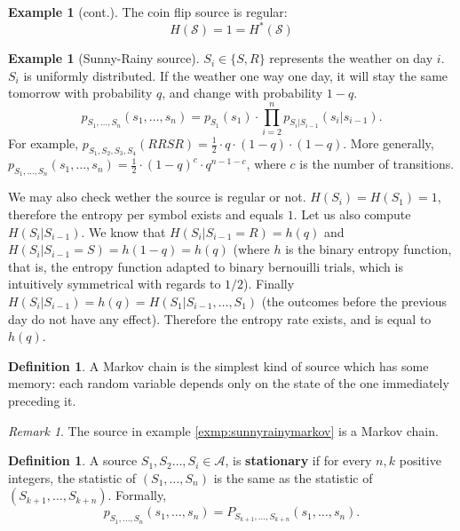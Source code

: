 \documentclass{report}
\theoremstyle{plain}
\theoremstyle{definition}
\newtheorem{exmp}[thm]{Example}
\newtheorem{defn}[thm]{Definition}
\theoremstyle{remark}
\newtheorem*{remark}{Remark}
\begin{document}
\begin{exmp}[cont.]
	The coin flip source is regular:
	\begin{equation*}
		H(\mathcal S) = 1 = H^*(\mathcal S)
	\end{equation*}
\end{exmp}

\label{exmp:sunnyrainymarkov}\begin{exmp}[Sunny-Rainy source]
	$S_i \in \{S, R\}$ represents the weather on day $i$. $S_i$ is uniformly distributed. If the weather one way one day, it will stay the same tomorrow with probability $q$, and change with probability $1-q$.
	\begin{equation*}
		p_{S_1, \ldots, S_n} (s_1, \ldots, s_n) =  p_{S_1}(s_1) \cdot \prod_{i = 2}^n p_{S_i | S_{i-1}}(s_i | s_{i-1}).
	\end{equation*}
	For example, $p_{S_1, S_2, S_3, S_4} (RRSR) = \frac12 \cdot q \cdot (1-q) \cdot (1-q)$. More generally, $p_{S_1, \ldots, S_n}(s_1, \ldots, s_n) = \frac12 \cdot (1-q)^c \cdot q^{n-1-c}$, where $c$ is the number of transitions. \par
	We may also check wether the source is regular or not. $H(S_i) = H(S_1) = 1$, therefore the entropy per symbol exists and equals $1$. Let us also compute $H(S_i | S_{i-1})$. We know that $H(S_i | S_{i-1} = R) = h(q)$ and $H(S_i | S_{i-1} = S) = h(1-q) = h(q)$ (where $h$ is the binary entropy function, that is, the entropy function adapted to binary bernouilli trials, which is intuitively symmetrical with regards to $1/2$). Finally $H(S_i | S_{i-1}) = h(q) = H(S_1 | S_{i-1}, \ldots, S_1)$ (the outcomes before the previous day do not have any effect). Therefore the entropy rate exists, and is equal to $h(q)$.
\end{exmp}

\begin{defn}
	A Markov chain is the simplest kind of source which has some memory: each random variable depends only on the state of the one immediately preceding it.
\end{defn}
\begin{remark}
	The source in example \ref{exmp:sunnyrainymarkov} is a Markov chain.
\end{remark}

\begin{defn}
	A source $S_1,  S_2 \ldots, S_i \in \mathcal A$, is \textbf{stationary} if for every $n, k$ positive integers, the statistic of $(S_1, \ldots, S_n)$ is the same as the statistic of $(S_{k+1}, \ldots, S_{k+n})$. Formally,
	\begin{equation}
		p_{S_1, \ldots, S_n}(s_1, \ldots, s_n) = P_{S_{k+1}, \ldots, S_{k+n}}(s_1, \ldots, s_n).
	\end{equation}
\end{defn}
\end{document}
